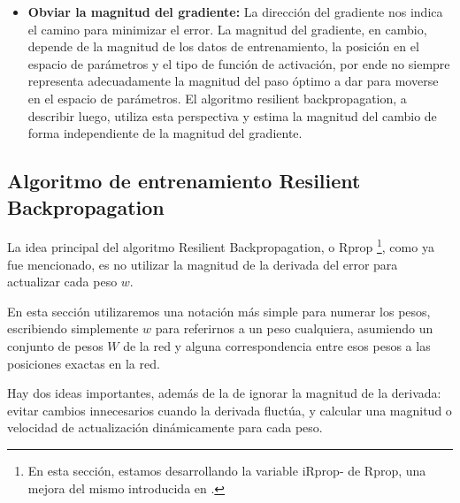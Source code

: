 \begin{itemize}
\item \textbf{Obviar la magnitud del gradiente:} La dirección del gradiente nos indica el camino para minimizar el error. La magnitud del gradiente, en cambio, depende de la magnitud de los datos de entrenamiento, la posición en el espacio de parámetros y el tipo de función de activación, por ende no siempre representa adecuadamente la magnitud del paso óptimo a dar para moverse en el espacio de parámetros. El algoritmo resilient backpropagation, a describir luego, utiliza esta perspectiva y estima la magnitud del cambio de forma independiente de la magnitud del gradiente.
\end{itemize}

\subsection{Algoritmo de entrenamiento Resilient Backpropagation}

\newcommand{\wi}{w_i}
\newcommand{\wt}{w^t}
\newcommand{\wtp}{w^{t+1}}
\newcommand{\wtm}{w^{t-1}}

\newcommand{\vmax}{\Delta_{max}}
\newcommand{\vmin}{\Delta_{min}}
\newcommand{\accinc}{\eta^+}
\newcommand{\accdec}{\eta^-}
\newcommand{\vt}{\Delta^{t}_w}
\newcommand{\vtp}{\Delta^{t+1}_w}
\newcommand{\dvt}{\dv{E(t)}{\wt}}
\newcommand{\dvtm}{\dv{E(t-1)}{\wtm}}
\newcommand{\dwtm}{\Delta\wtm}
\newcommand{\dwt}{\Delta\wt}
\newcommand{\multidv}{ \dvt \cdot \dvtm}


La idea principal del algoritmo Resilient Backpropagation, o Rprop \cite{Riedmiller93} \footnote{En esta sección, estamos desarrollando la variable iRprop- de Rprop, una mejora del mismo introducida en \cite{Igel00,Igel03}.}, como ya fue mencionado, es no utilizar la magnitud de la derivada del error para actualizar cada peso $w$. 

En esta sección utilizaremos una notación más simple para numerar los pesos, escribiendo simplemente $w$ para referirnos a un peso cualquiera, asumiendo un conjunto de pesos $W$ de la red y alguna correspondencia entre esos pesos a las posiciones exactas en la red.  

Hay dos ideas importantes, además de la de ignorar la magnitud de la derivada: evitar cambios innecesarios cuando la derivada fluctúa, y calcular una magnitud o velocidad de actualización dinámicamente para cada peso.

